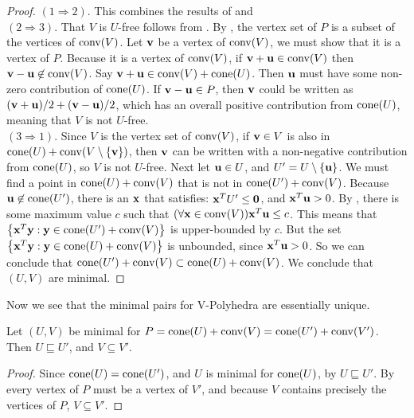\begin{proof}
	$(1 \Rightarrow 2)$.  This combines the results of  and \\
	$(2 \Rightarrow 3)$.  That $V$ is $U$-free follows from .  By , the vertex set of $P$ is a subset of the vertices of $\operatorname{conv}(V)$.  Let $\mathbf{v}$ be a vertex of $\operatorname{conv}(V)$, we must show that it is a vertex of $P$.  Because it is a vertex of $\operatorname{conv}(V)$, if $\mathbf{v}+\mathbf{u}\in\operatorname{conv}(V)$ then $\mathbf{v}-\mathbf{u}\not\in\operatorname{conv}(V)$.  Say $\mathbf{v}+\mathbf{u}\in\operatorname{conv}(V)+\operatorname{cone}(U)$.  Then $\mathbf{u}$ must have some non-zero contribution of $\operatorname{cone}(U)$.  If $\mathbf{v}-\mathbf{u}\in P$, then $\mathbf{v}$ could be written as $(\mathbf{v}+\mathbf{u})/2 + (\mathbf{v}-\mathbf{u})/2$, which has an overall positive contribution from $\operatorname{cone}(U)$, meaning that $V$ is not $U$-free.\\
	$(3 \Rightarrow 1)$.  Since $V$ is the vertex set of $\operatorname{conv}(V)$, if $\mathbf{v}\in V$ is also in $\operatorname{cone}(U) + \operatorname{conv}(V\setminus\left\{\mathbf{v}\right\})$, then $\mathbf{v}$ can be written with a non-negative contribution from $\operatorname{cone}(U)$, so $V$ is not $U$-free.  Next let $\mathbf{u}\in U$, and $U'=U\setminus\left\{\mathbf{u}\right\}$.  We must find a point in $\operatorname{cone}(U) + \operatorname{conv}(V)$ that is not in $\operatorname{cone}(U') + \operatorname{conv}(V)$.  Because $\mathbf{u} \not\in\operatorname{cone}(U')$, there is an $\mathbf{x}$ that satisfies: $\mathbf{x}^T U' \leq \mathbf{0}$, and $\mathbf{x}^T \mathbf{u} > 0$.  By , there is some maximum value $c$ such that $(\forall \mathbf{x}\in\operatorname{conv}(V)) \mathbf{x}^T \mathbf{u} \leq c$.  This means that $\left\{\mathbf{x}^T \mathbf{y} : \mathbf{y} \in \operatorname{cone}(U') + \operatorname{conv}(V)\right\}$ is upper-bounded by $c$.  But the set $\left\{\mathbf{x}^T \mathbf{y} : \mathbf{y} \in \operatorname{cone}(U) + \operatorname{conv}(V)\right\}$ is unbounded, since $\mathbf{x}^T \mathbf{u} > 0$.  So we can conclude that $\operatorname{cone}(U') + \operatorname{conv}(V) \subset \operatorname{cone}(U) + \operatorname{conv}(V)$.  We conclude that $(U,V)$ are minimal.
\end{proof}

Now we see that the minimal pairs for V-Polyhedra are essentially unique.

\begin{Prop}
	Let $(U,V)$ be minimal for $P = \operatorname{cone}(U) + \operatorname{conv}(V) = \operatorname{cone}(U') + \operatorname{conv}(V')$.  Then $U\sqsubseteq U'$, and $V\subseteq V'$.
\end{Prop}

\begin{proof}
	Since $\operatorname{cone}(U) = \operatorname{cone}(U')$, and $U$ is minimal for $\operatorname{cone}(U)$, by  $U\sqsubseteq U'$.  By  every vertex of $P$ must be a vertex of $V'$, and because $V$ contains precisely the vertices of $P$, $V\subseteq V'$.
\end{proof}

